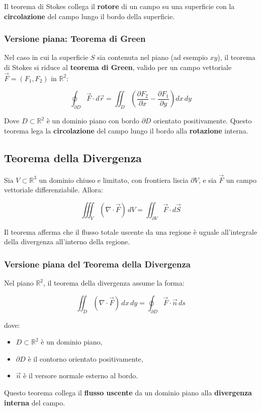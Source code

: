 \documentclass{article}
\begin{document}
Il teorema di Stokes collega il \textbf{rotore} di un campo su una superficie con la \textbf{circolazione} del campo lungo il bordo della superficie.

\subsubsection*{Versione piana: Teorema di Green}
Nel caso in cui la superficie \( S \) sia contenuta nel piano (ad esempio \( xy \)), il teorema di Stokes si riduce al \textbf{teorema di Green}, valido per un campo vettoriale \( \vec{F} = (F_1, F_2) \) in \( \mathbb{R}^2 \):

\[
\oint_{\partial D} \vec{F} \cdot d\vec{r} = \iint_D \left( \frac{\partial F_2}{\partial x} - \frac{\partial F_1}{\partial y} \right) dx\,dy
\]

Dove \( D \subset \mathbb{R}^2 \) è un dominio piano con bordo \( \partial D \) orientato positivamente. Questo teorema lega la \textbf{circolazione} del campo lungo il bordo alla \textbf{rotazione} interna.

\subsection{Teorema della Divergenza}
Sia \( V \subset \mathbb{R}^3 \) un dominio chiuso e limitato, con frontiera liscia \( \partial V \), e sia \( \vec{F} \) un campo vettoriale differenziabile. Allora:

\[
\iiint_V (\nabla \cdot \vec{F}) \, dV = \iint_{\partial V} \vec{F} \cdot d\vec{S}
\]

Il teorema afferma che il flusso totale uscente da una regione è uguale all'integrale della divergenza all'interno della regione.

\subsubsection*{Versione piana del Teorema della Divergenza}
Nel piano \( \mathbb{R}^2 \), il teorema della divergenza assume la forma:

\[
\iint_D (\nabla \cdot \vec{F}) \, dx\,dy = \oint_{\partial D} \vec{F} \cdot \vec{n} \, ds
\]

dove:
\begin{itemize}
    \item \( D \subset \mathbb{R}^2 \) è un dominio piano,
    \item \( \partial D \) è il contorno orientato positivamente,
    \item \( \vec{n} \) è il versore normale esterno al bordo.
\end{itemize}

Questo teorema collega il \textbf{flusso uscente} da un dominio piano alla \textbf{divergenza interna} del campo.
\end{document}
